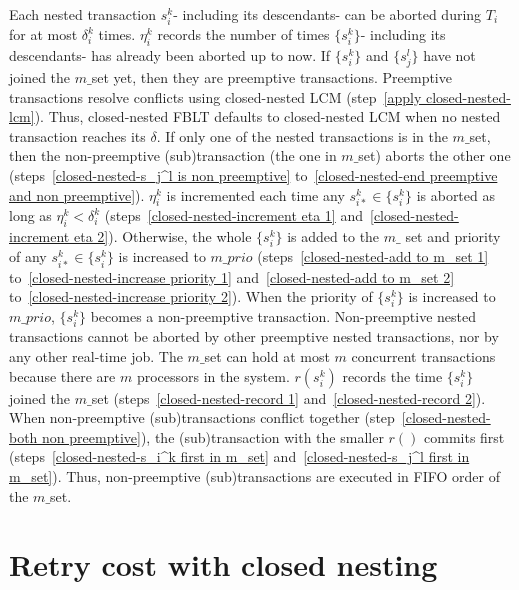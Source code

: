 \documentclass[10pt, conference, compsocconf]{IEEEtran}
\begin{document}
Each nested transaction $s_{i}^{k}$- including its descendants- can be aborted during $T_i$ for at most $\delta_{i}^{k}$ times. $\eta_{i}^{k}$ records  the number of times $\{s_{i}^{k}\}$- including its descendants- has already been aborted up to now. If $\{s_i^k\}$ and $\{s_j^l\}$ have not joined the $m\_$set yet, then they are preemptive transactions. Preemptive transactions resolve conflicts using closed-nested LCM (step~\ref{apply closed-nested-lcm}). Thus, closed-nested FBLT defaults to closed-nested LCM when no nested transaction reaches its $\delta$. If only one of the nested transactions is in the $m\_$set, then the non-preemptive (sub)transaction (the one in $m\_$set) aborts the other one (steps~\ref{closed-nested-s_j^l is non preemptive} to~\ref{closed-nested-end preemptive and non preemptive}). $\eta_i^k$ is incremented each time any $s_{i*}^k \in \{s_i^k\}$ is aborted as long as $\eta_i^k < \delta_i^k$ (steps~\ref{closed-nested-increment eta 1} and~\ref{closed-nested-increment eta 2}). Otherwise, the whole $\{s_i^k\}$ is added to the $m\_$ set and priority of any $s_{i*}^k \in \{s_i^k\}$ is increased to $m\_prio$ (steps~\ref{closed-nested-add to m_set 1} to~\ref{closed-nested-increase priority 1} and~\ref{closed-nested-add to m_set 2} to~\ref{closed-nested-increase priority 2}). When the priority of $\{s_i^k\}$ is increased to $m\_prio$, $\{s_i^k\}$ becomes a non-preemptive transaction. Non-preemptive nested transactions cannot be aborted by other preemptive nested transactions, nor by any other real-time job. The $m\_$set can hold at most $m$ concurrent transactions because there are $m$ processors in the system. $r(s_i^k)$ records the time $\{s_i^k\}$ joined the $m\_$set (steps~\ref{closed-nested-record 1} and~\ref{closed-nested-record 2}). When non-preemptive (sub)transactions conflict together (step~\ref{closed-nested-both non preemptive}), the (sub)transaction with the smaller $r()$ commits first (steps~\ref{closed-nested-s_i^k first in m_set} and~\ref{closed-nested-s_j^l first in m_set}). Thus, non-preemptive (sub)transactions are executed in FIFO order of the $m\_$set.

\section{Retry cost with closed nesting}\label{sec:closed_nested_fblt rc}
\end{document}
